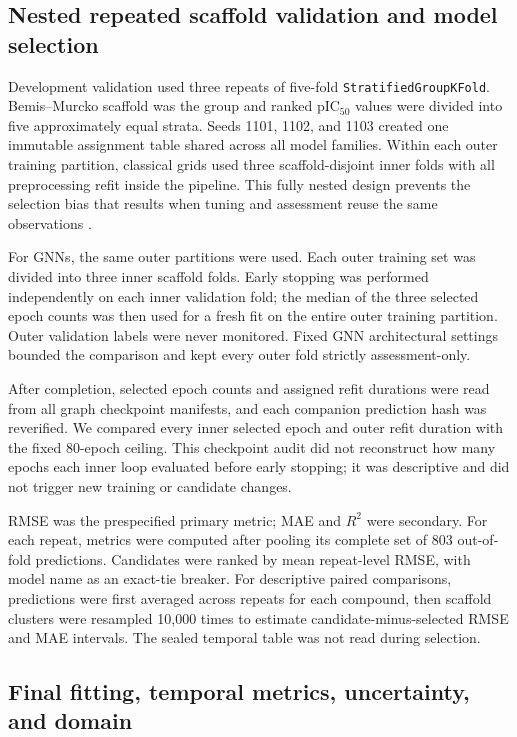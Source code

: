 \documentclass[11pt]{article}
\begin{document}
\subsection{Nested repeated scaffold validation and model selection}

Development validation used three repeats of five-fold
\texttt{StratifiedGroupKFold}. Bemis--Murcko scaffold was the group and ranked
pIC$_{50}$ values were divided into five approximately equal strata. Seeds 1101,
1102, and 1103 created one immutable assignment table shared across all model
families. Within each outer training partition, classical grids used three
scaffold-disjoint inner folds with all preprocessing refit inside the pipeline.
This fully nested design prevents the selection bias that results when tuning and
assessment reuse the same observations \citep{varma2006bias}.

For GNNs, the same outer partitions were used. Each outer training set was divided
into three inner scaffold folds. Early stopping was performed independently on
each inner validation fold; the median of the three selected epoch counts was
then used for a fresh fit on the entire outer training partition. Outer validation
labels were never monitored. Fixed GNN architectural settings bounded the
comparison and kept every outer fold strictly assessment-only.

After completion, selected epoch counts and assigned refit durations were read
from all graph checkpoint manifests, and each companion prediction hash was
reverified. We compared every inner selected epoch and outer refit duration with
the fixed 80-epoch ceiling. This checkpoint audit did not reconstruct how many
epochs each inner loop evaluated before early stopping; it was descriptive and
did not trigger new training or candidate changes.

RMSE was the prespecified primary metric; MAE and $R^2$ were secondary. For each
repeat, metrics were computed after pooling its complete set of 803 out-of-fold
predictions. Candidates were ranked by mean repeat-level RMSE, with model name as
an exact-tie breaker. For descriptive paired comparisons, predictions were first
averaged across repeats for each compound, then scaffold clusters were resampled
10,000 times to estimate candidate-minus-selected RMSE and MAE intervals. The
sealed temporal table was not read during selection.

\subsection{Final fitting, temporal metrics, uncertainty, and domain}
\end{document}
